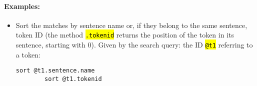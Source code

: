 \documentclass[12pt]{scrartcl}
\newcommand{\code}[1]{\hl{\texttt{#1}}}
\begin{document}
\paragraph*{Examples:}
\begin{itemize}
	\item Sort the matches by sentence name or, if they belong to the same sentence, token ID (the method \code{.tokenid} returns the position of the token in its sentence, starting with 0). Given by the search query: the ID \code{@t1} referring to a token:
	\begin{lstlisting}[gobble=8,aboveskip=.6em,belowskip=.2em]
		sort @t1.sentence.name
		sort @t1.tokenid
	\end{lstlisting}
\end{itemize}
\end{document}
